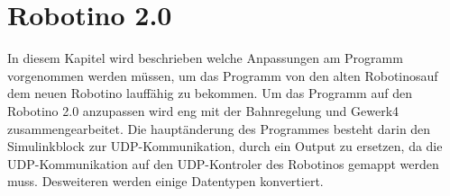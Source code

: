 \chapter{Robotino 2.0}
In diesem Kapitel wird beschrieben welche Anpassungen am Programm vorgenommen werden müssen, um das Programm von den alten Robotinosauf dem neuen Robotino lauffähig zu bekommen. Um das Programm auf den Robotino 2.0 anzupassen wird eng mit der Bahnregelung und Gewerk4 zusammengearbeitet. Die hauptänderung des Programmes besteht darin den Simulinkblock zur UDP-Kommunikation, durch ein Output zu ersetzen, da die UDP-Kommunikation auf den UDP-Kontroler des Robotinos gemappt werden muss. Desweiteren werden einige Datentypen konvertiert.
